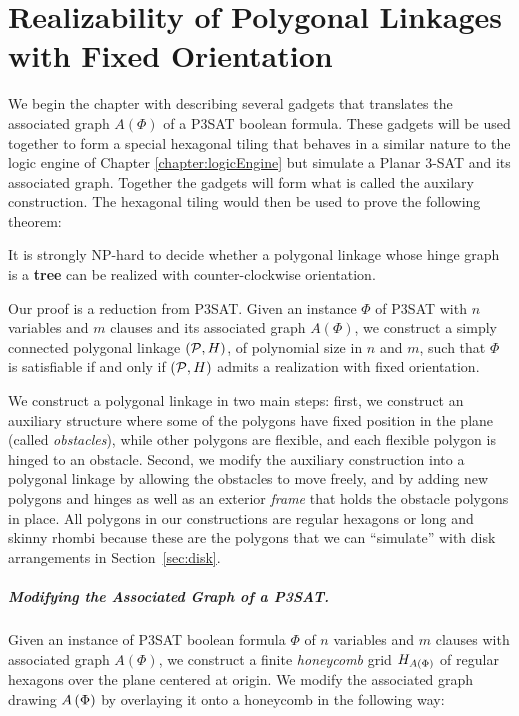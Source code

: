 \chapter{Realizability of Polygonal Linkages with Fixed Orientation\label{chapter:polygonalLinkage}}

We begin the chapter with describing several gadgets that translates the associated graph $A(\Phi)$ of a P3SAT boolean formula.  
These gadgets will be used together to form a special hexagonal tiling that behaves in a similar nature to the logic engine of Chapter \ref{chapter:logicEngine} but simulate a Planar 3-SAT and its associated graph.
Together the gadgets will form what is called the auxilary construction.
The hexagonal tiling would then be used to prove the following theorem:
\begin{thm}\label{thm:hinge2}
It is strongly NP-hard to decide whether a polygonal linkage whose hinge graph is a \textbf{tree} can be realized with counter-clockwise orientation.
\end{thm}
Our proof is a reduction from P3SAT.
Given an instance $\Phi$ of P3SAT with $n$ variables and $m$ clauses and its associated graph $A(\Phi)$, we construct a simply connected polygonal linkage $({\cal P},H)$, of polynomial size in $n$ and $m$, such that $\Phi$ is satisfiable if and only if $({\cal P},H)$ admits a realization with fixed orientation. 

We construct a polygonal linkage in two main steps: first, we construct an auxiliary structure where some of the polygons have fixed position in the plane (called \emph{obstacles}), while other polygons are flexible, and each flexible polygon is hinged to an obstacle. 
Second, we modify the auxiliary construction into a polygonal linkage by allowing the obstacles to move freely, and by adding new polygons and hinges as well as an exterior \emph{frame} that holds the obstacle polygons in place.
All polygons in our constructions are regular hexagons or long and skinny rhombi because these are the polygons that we can ``simulate'' with disk arrangements in Section~\ref{sec:disk}.
\paragraph{Modifying the Associated Graph of a P3SAT.}

Given an instance of P3SAT boolean formula $\Phi$ of $n$ variables and $m$ clauses with associated graph $A(\Phi)$, we construct a finite \textit{honeycomb} grid $H_{A \left( \Phi \right)}$ of regular hexagons over the plane centered at origin.
We modify the associated graph drawing $A\left( \Phi \right)$ by overlaying it onto a honeycomb in the following way:

